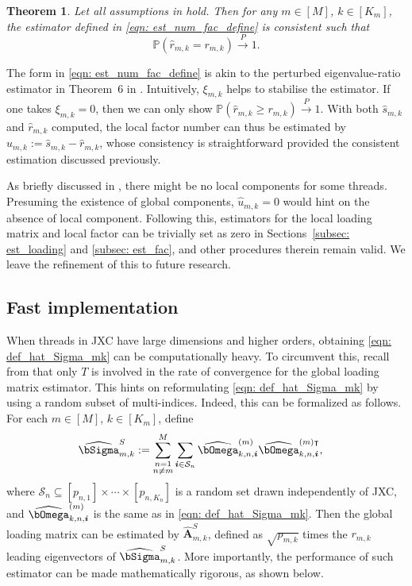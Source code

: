 \documentclass[aos]{imsart}
\theoremstyle{plain}
\newtheorem{theorem}{Theorem}[section]
\theoremstyle{definition}
\def\wh#1{\widehat{#1}}
\def\P{\mathbb{P}}
\def\cS{\mathcal{S}}
\def\bi{\boldsymbol{i}}
\def\bA{\mathbf{A}}
\def\trans{\intercal}
\begin{document}
\begin{theorem}\label{thm: eigenratio}
Let all assumptions in  hold. Then for any $m\in[M]$, $k\in[K_m]$, the estimator defined in \eqref{eqn: est_num_fac_define} is consistent such that
\[
\P(\wh{r}_{m,k} = r_{m,k} ) \xrightarrow{P} 1.
\]
\end{theorem}

The form in \eqref{eqn: est_num_fac_define} is akin to the perturbed eigenvalue-ratio estimator in Theorem~6 in \cite{Pelger2019}. Intuitively, $\xi_{m,k}$ helps to stabilise the estimator. If one takes $\xi_{m,k}=0$, then we can only show $\P(\wh{r}_{m,k} \geq r_{m,k} ) \xrightarrow{P} 1$. With both $\wh{s}_{m,k}$ and $\wh{r}_{m,k}$ computed, the local factor number can thus be estimated by $\wh{u}_{m,k} := \wh{s}_{m,k} -\wh{r}_{m,k}$, whose consistency is straightforward provided the consistent estimation discussed previously.

As briefly discussed in , there might be no local components for some threads. Presuming the existence of global components, $\wh{u}_{m,k}=0$ would hint on the absence of local component. Following this, estimators for the local loading matrix and local factor can be trivially set as zero in Sections~\ref{subsec: est_loading} and \ref{subsec: est_fac}, and other procedures therein remain valid. We leave the refinement of this to future research.








\subsection{Fast implementation}
\label{subsec: bootstrap_implement}

When threads in JXC have large dimensions and higher orders, obtaining \eqref{eqn: def_hat_Sigma_mk} can be computationally heavy. To circumvent this, recall from  that only $T$ is involved in the rate of convergence for the global loading matrix estimator. This hints on reformulating \eqref{eqn: def_hat_Sigma_mk} by using a random subset of multi-indices. Indeed, this can be formalized as follows. For each $m\in[M]$, $k\in[K_m]$, define
\begin{equation}
\label{eqn: def_hat_Sigma_mk_bootstrap}
\begin{split}
    \wh\bSigma_{m,k}^S &:= \sum_{\substack{n=1\\ n\neq m}}^M \sum_{\bi \in \cS_n} \wh\bOmega_{k,n,\bi}^{(m)} \wh\bOmega_{k,n,\bi}^{(m) \trans} ,
\end{split}
\end{equation}
where $\cS_n \subseteq [p_{n,1}] \times \cdots \times[p_{n,K_n}]$ is a random set drawn independently of JXC, and $\wh\bOmega_{k,n,\bi}^{(m)}$ is the same as in \eqref{eqn: def_hat_Sigma_mk}. Then the global loading matrix can be estimated by $\wh{\bA}_{m,k}^S$, defined as $\sqrt{p_{m,k}}$ times the $r_{m,k}$ leading eigenvectors of $\wh\bSigma_{m,k}^S$. More importantly, the performance of such estimator can be made mathematically rigorous, as shown below.
\end{document}
